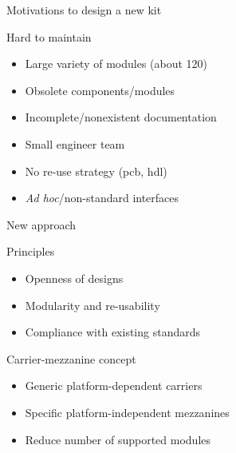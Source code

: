 \documentclass[compress,red]{beamer}
\begin{document}
\begin{frame}{Motivations to design a new kit}

  \begin{block}{Hard to maintain}
    \begin{itemize}
    \item Large variety of modules (about 120)
    \item Obsolete components/modules
    \item Incomplete/nonexistent documentation
    \item Small engineer team %
    \item No re-use strategy (pcb, hdl)
    \item \textit{Ad hoc}/non-standard interfaces %
    \end{itemize}
  \end{block}

\end{frame}

\begin{frame}{New approach}

  \begin{block}{Principles}
    \begin{itemize}
    \item Openness of designs
    \item Modularity and re-usability
    \item Compliance with existing standards
    \end{itemize}
  \end{block}

  \begin{block}{Carrier-mezzanine concept}
    \begin{itemize}
    \item Generic platform-dependent carriers
    \item Specific platform-independent mezzanines
    \item Reduce number of supported modules
    \end{itemize}
  \end{block}



\end{frame}
\end{document}
